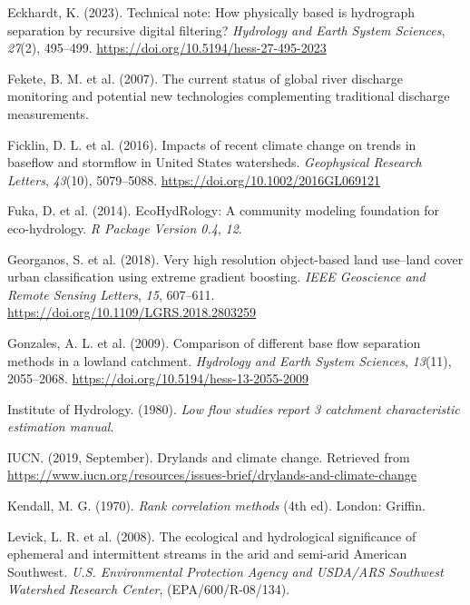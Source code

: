 \documentclass[
]{agujournal2019}
\newlength{\cslhangindent}
\newenvironment{CSLReferences}[2] %
 {\begin{list}{}{%
  \setlength{\itemindent}{0pt}
  \setlength{\leftmargin}{0pt}
  \setlength{\parsep}{0pt}
  \ifodd #1
   \setlength{\leftmargin}{\cslhangindent}
   \setlength{\itemindent}{-1\cslhangindent}
  \fi
  \setlength{\itemsep}{#2\baselineskip}}}
 {\end{list}}
\begin{document}
\begin{CSLReferences}{1}{0}
Eckhardt, K. (2023). Technical note: How physically based is hydrograph
separation by recursive digital filtering? \emph{Hydrology and Earth
System Sciences}, \emph{27}(2), 495--499.
\url{https://doi.org/10.5194/hess-27-495-2023}

Fekete, B. M. et al. (2007). The current status of global river
discharge monitoring and potential new technologies complementing
traditional discharge measurements.

Ficklin, D. L. et al. (2016). Impacts of recent climate change on trends
in baseflow and stormflow in United States watersheds. \emph{Geophysical
Research Letters}, \emph{43}(10), 5079--5088.
\url{https://doi.org/10.1002/2016GL069121}

Fuka, D. et al. (2014). EcoHydRology: A community modeling foundation
for eco-hydrology. \emph{R Package Version 0.4}, \emph{12}.

Georganos, S. et al. (2018). Very high resolution object-based land
use--land cover urban classification using extreme gradient boosting.
\emph{IEEE Geoscience and Remote Sensing Letters}, \emph{15}, 607--611.
\url{https://doi.org/10.1109/LGRS.2018.2803259}

Gonzales, A. L. et al. (2009). Comparison of different base flow
separation methods in a lowland catchment. \emph{Hydrology and Earth
System Sciences}, \emph{13}(11), 2055--2068.
\url{https://doi.org/10.5194/hess-13-2055-2009}

Institute of Hydrology. (1980). \emph{Low flow studies report 3
catchment characteristic estimation manual}.

IUCN. (2019, September). Drylands and climate change. Retrieved from
\url{https://www.iucn.org/resources/issues-brief/drylands-and-climate-change}

Kendall, M. G. (1970). \emph{Rank correlation methods} (4th ed). London:
Griffin.

Levick, L. R. et al. (2008). {The ecological and hydrological
significance of ephemeral and intermittent streams in the arid and
semi-arid American Southwest}. \emph{U.S. Environmental Protection
Agency and USDA/ARS Southwest Watershed Research Center},
(EPA/600/R-08/134).


\end{CSLReferences}
\end{document}
